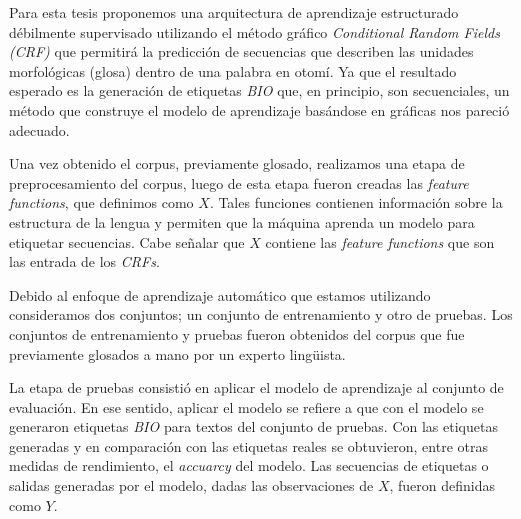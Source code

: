 \documentclass[letterpaper,12pt,oneside]{book}
\theoremstyle{definition}
\begin{document}

Para esta tesis proponemos una arquitectura de aprendizaje estructurado débilmente supervisado utilizando el método gráfico \textit{Conditional Random Fields (CRF)} que permitirá la predicción de secuencias que describen las unidades morfológicas (glosa) dentro de una palabra en otomí. Ya que el resultado esperado es la generación de etiquetas \textit{BIO} que, en principio, son secuenciales, un método que construye el modelo de aprendizaje basándose en gráficas nos pareció adecuado.

Una vez obtenido el corpus, previamente glosado, realizamos una etapa de preprocesamiento del corpus, luego de esta etapa fueron creadas las \textit{feature functions}, que definimos como $X$. Tales funciones contienen información sobre la estructura de la lengua y permiten que la máquina aprenda un modelo para etiquetar secuencias. Cabe señalar que $X$ contiene las \textit{feature functions} que son las entrada de los \textit{CRFs}.

Debido al enfoque de aprendizaje automático que estamos utilizando consideramos dos conjuntos; un conjunto de entrenamiento y otro de pruebas. Los conjuntos de entrenamiento y pruebas fueron obtenidos del corpus que fue previamente glosados a mano por un experto lingüista.

La etapa de pruebas consistió en aplicar el modelo de aprendizaje al conjunto de evaluación. En ese sentido, aplicar el modelo se refiere a que con el modelo se generaron etiquetas \textit{BIO} para textos del conjunto de pruebas. Con las etiquetas generadas y en comparación con las etiquetas reales se obtuvieron, entre otras medidas de rendimiento, el \textit{accuarcy} del modelo. Las secuencias de etiquetas o salidas generadas por el modelo, dadas las observaciones de $X$, fueron definidas como $Y$.
\end{document}

